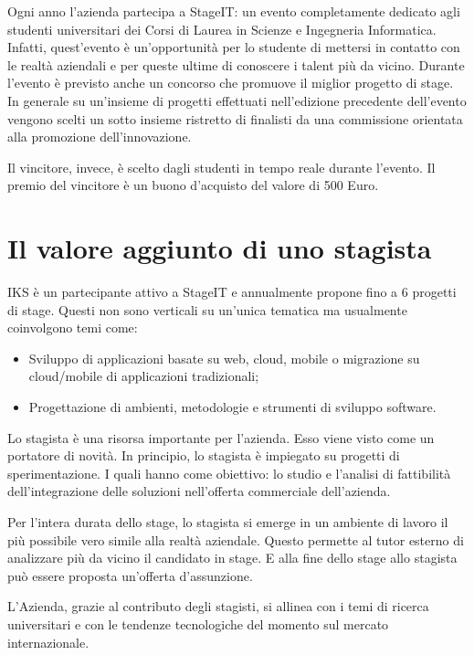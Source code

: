 Ogni anno l'azienda partecipa a StageIT: un evento completamente dedicato agli 
studenti universitari dei Corsi di Laurea in Scienze e Ingegneria Informatica.
Infatti, quest'evento è un'opportunità per lo studente di mettersi in contatto con 
le realtà aziendali e per queste ultime di conoscere i talent più da vicino. 
Durante l'evento è previsto anche un concorso che promuove il miglior progetto 
di stage. In generale su un'insieme di progetti effettuati nell'edizione
precedente dell'evento vengono scelti un sotto insieme ristretto di finalisti
da una commissione orientata alla promozione dell'innovazione. 

Il vincitore, invece, è scelto dagli studenti in tempo reale durante l'evento. Il premio del vincitore è un buono d'acquisto del valore di 500 Euro.

\section{Il valore aggiunto di uno stagista}

IKS è un partecipante attivo a StageIT e annualmente propone fino a 
6 progetti di stage. Questi non sono verticali su un'unica 
tematica ma usualmente coinvolgono temi come: 

\begin{itemize}
	\item Sviluppo di applicazioni basate su web, \gls{cloud}, mobile 
	      o migrazione su \gls{cloud}/mobile di applicazioni tradizionali;
	\item Progettazione di ambienti, metodologie e strumenti di 
	      sviluppo software.
\end{itemize}

Lo stagista è una risorsa importante per l'azienda. Esso viene visto 
come un portatore di novità. In principio, lo stagista è impiegato su progetti 
di sperimentazione. I quali hanno come obiettivo: lo studio e l'analisi 
di fattibilità dell'integrazione delle soluzioni nell'offerta commerciale dell'azienda. 

Per l'intera durata dello stage, lo stagista si emerge in un ambiente di lavoro il più possibile vero simile alla realtà aziendale. Questo permette al tutor esterno di analizzare più da vicino il candidato in stage. E alla fine dello stage allo stagista può essere proposta un'offerta d'assunzione. 

L'Azienda, grazie al contributo degli stagisti, si allinea con i temi di ricerca 
universitari e con le tendenze tecnologiche del momento sul mercato internazionale.

